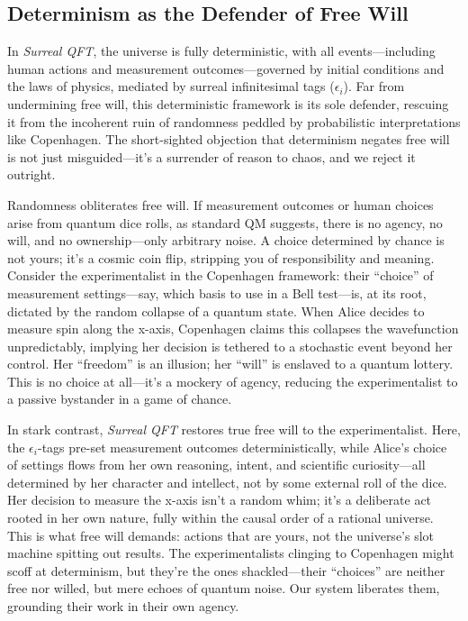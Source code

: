 \documentclass{article}
\begin{document}
\subsection{Determinism as the Defender of Free Will}
In \textit{Surreal QFT}, the universe is fully deterministic, with all events---including human actions and measurement outcomes---governed by initial conditions and the laws of physics, mediated by surreal infinitesimal tags (\(\epsilon_i\)). Far from undermining free will, this deterministic framework is its sole defender, rescuing it from the incoherent ruin of randomness peddled by probabilistic interpretations like Copenhagen. The short-sighted objection that determinism negates free will is not just misguided---it's a surrender of reason to chaos, and we reject it outright.

Randomness obliterates free will. If measurement outcomes or human choices arise from quantum dice rolls, as standard QM suggests, there is no agency, no will, and no ownership---only arbitrary noise. A choice determined by chance is not yours; it's a cosmic coin flip, stripping you of responsibility and meaning. Consider the experimentalist in the Copenhagen framework: their ``choice'' of measurement settings---say, which basis to use in a Bell test---is, at its root, dictated by the random collapse of a quantum state. When Alice decides to measure spin along the x-axis, Copenhagen claims this collapses the wavefunction unpredictably, implying her decision is tethered to a stochastic event beyond her control. Her ``freedom'' is an illusion; her ``will'' is enslaved to a quantum lottery. This is no choice at all---it's a mockery of agency, reducing the experimentalist to a passive bystander in a game of chance.

In stark contrast, \textit{Surreal QFT} restores true free will to the experimentalist. Here, the \(\epsilon_i\)-tags pre-set measurement outcomes deterministically, while Alice's choice of settings flows from her own reasoning, intent, and scientific curiosity---all determined by her character and intellect, not by some external roll of the dice. Her decision to measure the x-axis isn't a random whim; it's a deliberate act rooted in her own nature, fully within the causal order of a rational universe. This is what free will demands: actions that are yours, not the universe's slot machine spitting out results. The experimentalists clinging to Copenhagen might scoff at determinism, but they're the ones shackled---their ``choices'' are neither free nor willed, but mere echoes of quantum noise. Our system liberates them, grounding their work in their own agency.
\end{document}
